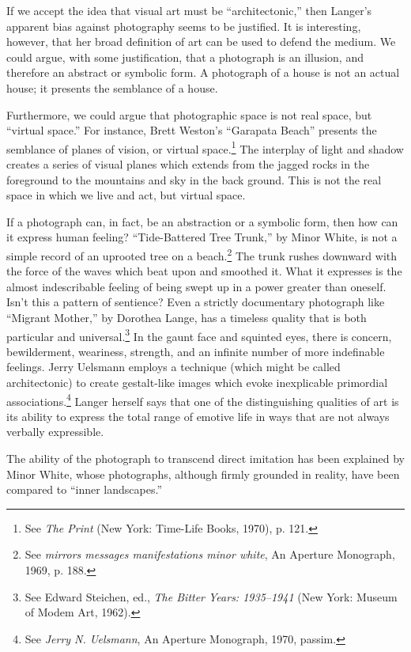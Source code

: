 \documentclass{tufte-handout}
\begin{document}

If we accept the idea that visual art must be ``architectonic,'' then
Lan­ger's apparent bias against photography seems to be justified. It is
interest­ing, however, that her broad definition of art can be used to
defend the medium. We could argue, with some justification, that a
photograph is an illusion, and therefore an abstract or symbolic form. A
photograph of a house is not an actual house; it presents the semblance
of a house.

Furthermore, we could argue that photographic space is not real space,
but ``virtual space.'' For instance, Brett Weston's ``Garapata Beach''
pre­sents the semblance of planes of vision, or virtual space.\footnote{See
  \emph{The Print} (New York: Time-Life Books, 1970), p. 121.} The
interplay of light and shadow creates a series of visual planes which
extends from the jagged rocks in the foreground to the mountains and sky
in the back­ ground. This is not the real space in which we live and act,
but virtual space.

If a photograph can, in fact, be an abstraction or a symbolic form, then
how can it express human feeling? ``Tide-Battered Tree Trunk,'' by Minor
White, is not a simple record of an uprooted tree on a beach.\footnote{See
  \emph{mirrors messages manifestations minor white}, An Aperture
  Monograph, 1969, p. 188.} The trunk rushes downward with the force of
the waves which beat upon and smoothed it. What it expresses is the
almost indescribable feeling of being swept up in a power greater than
oneself. Isn't this a pattern of sentience? Even a strictly documentary
photograph like ``Migrant Mother,'' by Doro­thea Lange, has a timeless
quality that is both particular and universal.\footnote{See Edward
  Steichen, ed., \emph{The Bitter Years: 1935--1941} (New York: Museum
  of Modem Art, 1962).} In the gaunt face and squinted eyes, there is
concern, bewilderment, weari­ness, strength, and an infinite number of
more indefinable feelings. Jerry Uelsmann employs a technique (which
might be called architectonic) to create gestalt-like images which evoke
inexplicable primordial associations.\footnote{See \emph{Jerry N.
  Uelsmann}, An Aperture Monograph, 1970, passim.} Langer herself says
that one of the distinguishing qualities of art is its ability to
express the total range of emotive life in ways that are not al­ways
verbally expressible.

The ability of the photograph to transcend direct imitation has been
ex­plained by Minor White, whose photographs, although firmly grounded in
reality, have been compared to ``inner landscapes.''
\end{document}
